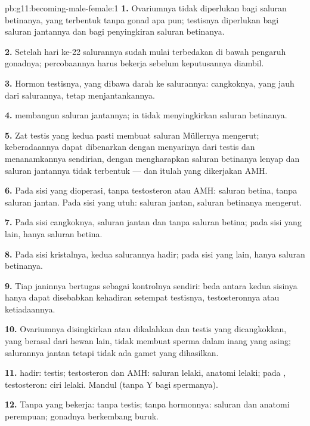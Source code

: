 \begin{solution}{pb:g11:becoming-male-female:1}
\textbf{1.} Ovariumnya tidak diperlukan bagi saluran betinanya, yang
terbentuk tanpa gonad apa pun; testisnya diperlukan bagi saluran
jantannya dan bagi penyingkiran saluran betinanya.

\textbf{2.} Setelah hari ke-22 salurannya sudah mulai terbedakan di
bawah pengaruh gonadnya; percobaannya harus bekerja sebelum
keputusannya diambil.

\textbf{3.} Hormon testisnya, yang dibawa darah ke salurannya:
cangkoknya, yang jauh dari salurannya, tetap menjantankannya.

\textbf{4.}  membangun saluran jantannya; ia tidak
menyingkirkan saluran betinanya.

\textbf{5.} Zat testis yang kedua pasti membuat saluran Müllernya
mengerut; keberadaannya dapat dibenarkan dengan menyarinya dari testis
dan menanamkannya sendirian, dengan mengharapkan saluran betinanya
lenyap dan saluran jantannya tidak terbentuk --- dan itulah yang
dikerjakan AMH.

\textbf{6.} Pada sisi yang dioperasi, tanpa testosteron atau AMH:
saluran betina, tanpa saluran jantan. Pada sisi yang utuh: saluran
jantan, saluran betinanya mengerut.

\textbf{7.} Pada sisi cangkoknya, saluran jantan dan tanpa saluran
betina; pada sisi yang lain, hanya saluran betina.

\textbf{8.} Pada sisi kristalnya, kedua salurannya hadir; pada sisi
yang lain, hanya saluran betinanya.

\textbf{9.} Tiap janinnya bertugas sebagai kontrolnya sendiri: beda
antara kedua sisinya hanya dapat disebabkan kehadiran setempat
testisnya, testosteronnya atau ketiadaannya.

\textbf{10.} Ovariumnya disingkirkan atau dikalahkan dan testis yang
dicangkokkan, yang berasal dari hewan lain, tidak membuat sperma dalam
inang yang asing; salurannya jantan tetapi tidak ada gamet yang dihasilkan.

\textbf{11.}  hadir: testis; testosteron dan AMH: saluran lelaki,
anatomi lelaki; pada , testosteron: ciri lelaki. Mandul
(tanpa  Y bagi spermanya).

\textbf{12.} Tanpa  yang bekerja: tanpa testis; tanpa hormonnya:
saluran dan anatomi perempuan; gonadnya berkembang buruk.


\end{solution}
